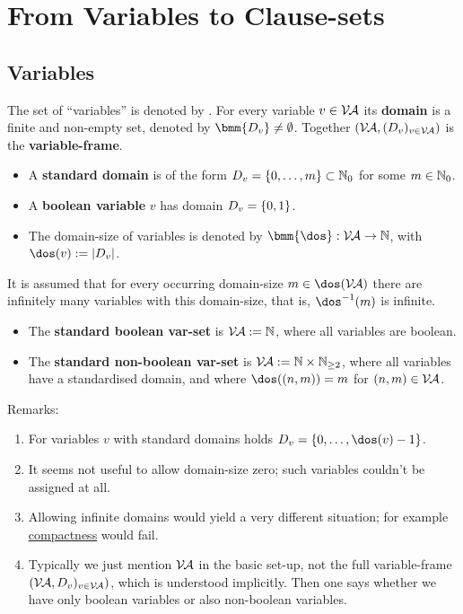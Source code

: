 \documentclass[12pt]{book}
\begin{document}
\chapter{From Variables to Clause-sets}
\label{cha:vartocls}

\section{Variables}
\label{sec:Variables}

\begin{defi}\label{def:var}
      The set of ``variables'' is denoted by \bmm{\Va}. For every variable $v \in \mathcal{V\hspace{-0.1em}A}$ its \textbf{domain} is a finite and non-empty set, denoted by 
	  $\bmm{D_v} \ne \es$. Together $(\mathcal{V\hspace{-0.1em}A}, (D_v)_{v \in \mathcal{V\hspace{-0.1em}A}})$ is the \textbf{variable-frame}.
      \begin{itemize}
            \item A \textbf{standard domain} is of the form $D_v = \{ 0, \dots, m \} \subset \mathbb{N}_0$ for some $m \in \mathbb{N}_0$.
            \item A \textbf{boolean variable} $v$ has domain $D_v = \{ 0,1 \}$.
            \item The domain-size of variables is denoted by $\bmm{\dos}: \Va \ra \NN$, with $\dos(v) := \abs{D_v}$.
      \end{itemize}
      It is assumed that for every occurring domain-size $m \in \dos(\Va)$ there are infinitely many variables with this domain-size, that is, $\dos^{-1}(m)$ is infinite.
      \begin{itemize}
            \item The \textbf{standard boolean var-set} is $\mathcal{V\hspace{-0.1em}A} := \mathbb{N}$, where all variables are boolean.
            \item The \textbf{standard non-boolean var-set} is $\mathcal{V\hspace{-0.1em}A} := \mathbb{N} \times \mathbb{N}_{\ge2}$, where all variables have a standardised domain, and where 
			$\dos((n,m)) = m$ for $(n,m) \in \mathcal{V\hspace{-0.1em}A}$.
      \end{itemize}
\end{defi}
Remarks:
\begin{enumerate}
      \item For variables $v$ with standard domains holds $D_v = \tb{0}{\dos(v)-1}$.
      \item It seems not useful to allow domain-size zero; such variables couldn't be assigned at all.
      \item Allowing infinite domains would yield a very different situation; for example \href{https://en.wikipedia.org/wiki/Compact_space}{compactness} would fail.
      \item Typically we just mention $\mathcal{V\hspace{-0.1em}A}$ in the basic set-up, not the full variable-frame $(\mathcal{V\hspace{-0.1em}A},
      D_v)_{v \in \mathcal{V\hspace{-0.1em}A}})$, which is understood implicitly. Then one says whether we have only boolean variables or also non-boolean variables.
\end{enumerate}
\end{document}
